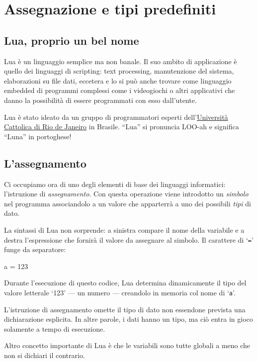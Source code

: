 
\chapter{Assegnazione e tipi predefiniti}
\label{chFondAssignment}


\section{Lua, proprio un bel nome}

Lua è un linguaggio semplice ma non banale. Il suo ambito di applicazione è
quello dei linguaggi di scripting: text processing, manutenzione del sistema,
elaborazioni su file dati, eccetera e lo si può anche trovare come linguaggio
embedded di programmi complessi come i videogiochi o altri applicativi
che danno la possibilità di essere programmati con esso dall'utente.

Lua è stato ideato da un gruppo di programmatori esperti
dell'\href{http://www.puc-rio.br/index.html}{Università Cattolica di Rio de
Janeiro} in Brasile. ``Lua'' si pronuncia LOO-ah e significa ``Luna'' in
portoghese!


\section{L'assegnamento}
\label{secFondAssegnamento}

Ci occupiamo ora di uno degli elementi di base dei linguaggi informatici:
l'istruzione di \emph{assegnamento}. Con questa operazione viene introdotto un
\emph{simbolo} nel programma associandolo a un valore che apparterrà a uno
dei possibili \emph{tipi} di dato.

La sintassi di Lua non sorprende: a sinistra compare il nome della variabile e
a destra l'espressione che fornirà il valore da assegnare al simbolo. Il
carattere di `\texttt{=}' funge da separatore:
\begin{lines}
a = 123
\end{lines}

Durante l'esecuzione di questo codice, Lua determina dinamicamente il tipo del
valore letterale `123' --- un numero --- creandolo in memoria col nome di
`\texttt{a}'.

L'istruzione di assegnamento omette il tipo di dato non essendone prevista una
dichiarazione esplicita. In altre parole, i dati hanno un tipo, ma ciò entra in
gioco solamente a tempo di esecuzione.

Altro concetto importante di Lua è che le variabili sono tutte globali a meno
che non si dichiari il contrario.


